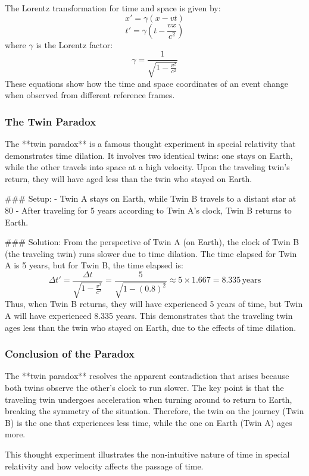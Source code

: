 \documentclass{article}
\begin{document}
The Lorentz transformation for time and space is given by:
\[
x' = \gamma (x - vt)
\]
\[
t' = \gamma \left( t - \frac{vx}{c^2} \right)
\]
where \( \gamma \) is the Lorentz factor:
\[
\gamma = \frac{1}{\sqrt{1 - \frac{v^2}{c^2}}}
\]
These equations show how the time and space coordinates of an event change when observed from different reference frames.

\subsubsection*{The Twin Paradox}

The **twin paradox** is a famous thought experiment in special relativity that demonstrates time dilation. It involves two identical twins: one stays on Earth, while the other travels into space at a high velocity. Upon the traveling twin's return, they will have aged less than the twin who stayed on Earth.

### Setup:
- Twin A stays on Earth, while Twin B travels to a distant star at 80%
- After traveling for 5 years according to Twin A's clock, Twin B returns to Earth.

### Solution:
From the perspective of Twin A (on Earth), the clock of Twin B (the traveling twin) runs slower due to time dilation. The time elapsed for Twin A is 5 years, but for Twin B, the time elapsed is:
\[
\Delta t' = \frac{\Delta t}{\sqrt{1 - \frac{v^2}{c^2}}} = \frac{5}{\sqrt{1 - (0.8)^2}} \approx 5 \times 1.667 = 8.335 \, \text{years}
\]
Thus, when Twin B returns, they will have experienced 5 years of time, but Twin A will have experienced 8.335 years. This demonstrates that the traveling twin ages less than the twin who stayed on Earth, due to the effects of time dilation.

\subsubsection*{Conclusion of the Paradox}

The **twin paradox** resolves the apparent contradiction that arises because both twins observe the other's clock to run slower. The key point is that the traveling twin undergoes acceleration when turning around to return to Earth, breaking the symmetry of the situation. Therefore, the twin on the journey (Twin B) is the one that experiences less time, while the one on Earth (Twin A) ages more.

This thought experiment illustrates the non-intuitive nature of time in special relativity and how velocity affects the passage of time.
\end{document}
